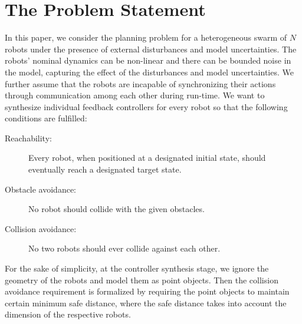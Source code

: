 
\section{The Problem Statement}
In this paper, we consider the planning problem for a heterogeneous swarm of $N$ robots under the presence of external disturbances and model uncertainties. 
The robots' nominal dynamics can be non-linear and there can be bounded noise in the model, capturing the effect of the disturbances and model uncertainties.
We further assume that the robots are incapable of synchronizing their actions through communication among each other during run-time.
We want to synthesize individual feedback controllers for every robot so that the following conditions are fulfilled:
\begin{description}
	\item[Reachability:] Every robot, when positioned at a designated initial state, should eventually reach a designated target state.
	\item[Obstacle avoidance:] No robot should collide with the given obstacles.
	\item[Collision avoidance:] No two robots should ever collide against each other.
\end{description}
For the sake of simplicity, at the controller synthesis stage, we ignore the geometry of the robots and model them as point objects.
Then the collision avoidance requirement is formalized by requiring the point objects to maintain certain minimum safe distance, where the safe distance takes into account the dimension of the respective robots.

